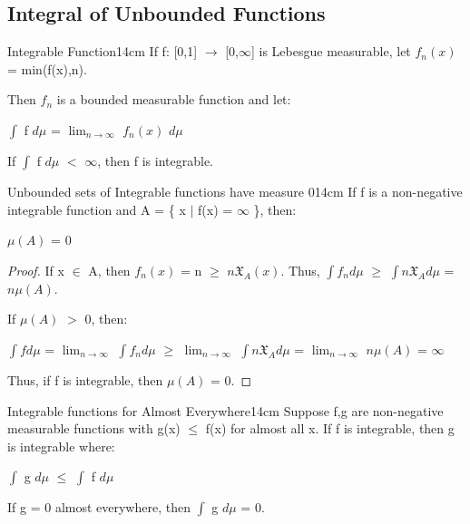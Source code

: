     \newpage



    
\subsection{ Integral of Unbounded Functions }

    \begin{definition}{Integrable Function}{14cm}
        If f: [0,1] $\rightarrow$ [0,$\infty$] is Lebesgue measurable,
        let $f_n(x)$ = min(f(x),n).

        Then $f_n$ is a bounded measurable function and let:

        \hspace{0.5cm}
        $\int$ f $d\mu$ = $\lim_{n \rightarrow \infty}$ $f_n(x)$ $d\mu$

        If $\int$ f $d\mu$ $<$ $\infty$, then f is {\color{lblue} integrable}.
    \end{definition}

    \vspace{0.5cm}



    \begin{wtheorem}{Unbounded sets of Integrable functions have measure 0}{14cm}
        If f is a non-negative integrable function and
        A = \{ x $|$ f(x) = $\infty$ \}, then:
        
        \hspace{0.5cm}
        $\mu(A)$ = 0 
    \end{wtheorem}

    \begin{proof}
        If x $\in$ A, then $f_n(x)$ = n $\geq$ $n \mathfrak{X}_A(x)$.
        Thus, $\int f_n d\mu$ $\geq$ $\int n \mathfrak{X}_A d\mu$ = $n\mu(A)$.

        If $\mu(A)$ $>$ 0, then:

        \hspace{0.5cm}
        $\int f d\mu$
        = $\lim_{n \rightarrow \infty}$ $\int f_n d\mu$
        $\geq$ $\lim_{n \rightarrow \infty}$ $\int n \mathfrak{X}_A d\mu$
        = $\lim_{n \rightarrow \infty}$ $n\mu(A)$
        = $\infty$

        Thus, if f is integrable, then $\mu(A)$ = 0.
    \end{proof}

    \vspace{0.5cm}



    \begin{wtheorem}{Integrable functions for Almost Everywhere}{14cm}
        Suppose f,g are non-negative measurable functions with g(x) $\leq$ f(x)
        for almost all x. If f is integrable, then g is integrable where:

        \hspace{0.5cm}
        $\int$ g $d\mu$
        $\leq$ $\int$ f $d\mu$

        If g = 0 almost everywhere, then $\int$ g $d\mu$ = 0.
    \end{wtheorem}

